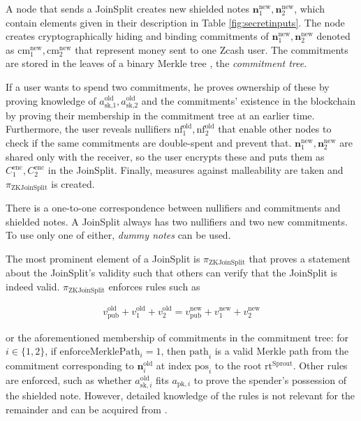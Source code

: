 \documentclass{article}
\begin{document}
A node that sends a JoinSplit creates new shielded notes $\boldsymbol{n}^\text{new}_1,\boldsymbol{n}^\text{new}_2$, which contain elements given in their description in Table \ref{fig:secretinputs}.
The node creates cryptographically hiding and binding commitments of $\boldsymbol{n}^\text{new}_1,\boldsymbol{n}^\text{new}_2$ denoted as $\text{cm}_1^\text{new}, {\text{cm}_2^\text{new}}$ that represent money sent to one Zcash user.
The commitments are stored in the leaves of a binary Merkle tree \cite{merkle:tree}, the \textit{commitment tree}.

If a user wants to spend two commitments, he proves ownership of these by proving knowledge of $a_\text{sk,$1$}^\text{old}, a_\text{sk,$2$}^\text{old}$ and the commitments' existence in the blockchain by proving their membership in the commitment tree at an earlier time.
Furthermore, the user reveals nullifiers $\text{nf}_1^\text{old}, {\text{nf}_2^\text{old}}$ that enable other nodes to check if the same commitments are double-spent and prevent that.
$\boldsymbol{n}^\text{new}_1,\boldsymbol{n}^\text{new}_2$ are shared only with the receiver, so the user encrypts these and puts them as $C_1^\text{enc}, C_2^\text{enc}$ in the JoinSplit.
Finally, measures against malleability are taken and $\pi_\text{ZKJoinSplit}$ is created.

There is a one-to-one correspondence between nullifiers and commitments and shielded notes.
A JoinSplit always has two nullifiers and two new commitments.
To use only one of either, \textit{dummy notes} can be used.

The most prominent element of a JoinSplit is $\pi_\text{ZKJoinSplit}$ that proves a statement about the JoinSplit's validity such that others can verify that the JoinSplit is indeed valid.
$\pi_\text{ZKJoinSplit}$ enforces rules such as

\begin{align}v_\text{pub}^\text{old} + v_1^\text{old} + v_2^\text{old} = v_\text{pub}^\text{new} + v_1^\text{new} + v_2^\text{new} \label{eq:balance}\end{align}

or the aforementioned membership of commitments in the commitment tree: for $i \in \{1,2\}$, if $\text{enforceMerklePath}_i = 1$, then $\text{path}_i$ is a valid Merkle path from the commitment corresponding to $\boldsymbol{n}_i^\text{old}$ at index $\text{pos}_i$ to the root $\text{rt}^\text{Sprout}$.
Other rules are enforced, such as whether $a^\text{old}_{\text{sk},i}$ fits $a_{\text{pk},i}$ to prove the spender's possession of the shielded note. However, detailed knowledge of the rules is not relevant for the remainder and can be acquired from \cite{hopwood:zcash}.
\end{document}
